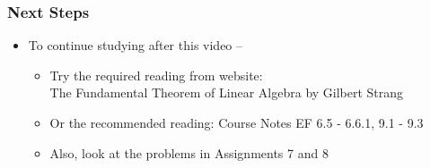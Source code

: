 \documentclass[10pt,english,aspectratio=169]{beamer}
\begin{document}
\begin{frame} \frametitle{Next Steps}

\begin{itemize}
\setlength\itemsep{5mm}
\item To continue studying after this video -- \vspace{2mm}

\begin{itemize}
 \setlength\itemsep{3mm}
 
 \item Try the required reading from website: \\[1mm] \hspace{5mm} The Fundamental Theorem of Linear Algebra by Gilbert Strang
 
 \item Or the recommended reading:  Course Notes EF 6.5 - 6.6.1, 9.1 - 9.3

 \item Also, look at the problems in Assignments 7 and 8
\end{itemize}
\end{itemize}


\end{frame}
\end{document}
